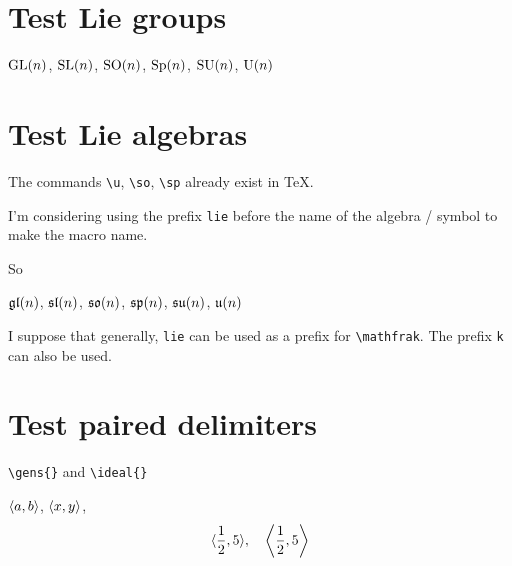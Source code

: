 \documentclass{scrartcl}
\begin{document}
\section{Test Lie groups}

$\GL(n)$, $\SL(n)$, $\SO(n)$, $\Sp(n)$, $\SU(n)$, $\U(n)$

\section{Test Lie algebras}

The commands \verb|\u|, \verb|\so|, \verb|\sp| already exist in \TeX.

I'm considering using the prefix \texttt{lie} before the name of the algebra / symbol to make the macro name.

So
\begin{LTXexample}[pos=b]
$\liegl(n)$, $\liesl(n)$, $\lieso(n)$, $\liesp(n)$, $\liesu(n)$, $\lieu(n)$
\end{LTXexample}


I suppose that generally, \texttt{lie} can be used as a prefix for \verb|\mathfrak|.
The prefix \texttt{k} can also be used.

\section{Test paired delimiters}
\verb|\gens{}| and \verb|\ideal{}|

$\gens{a,b}$,
$\ideal{x,y}$,
\[
\gens{\frac12, 5}, \quad
\gens*{\frac12, 5}
\]
\end{document}
